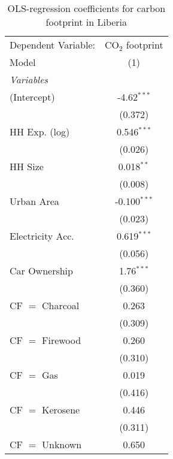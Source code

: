 
\begin{table}[htbp!]
   \centering
   \small
   \begin{adjustbox}{width = 1\textwidth, max height = 0.95\textheight, center}
      \begin{threeparttable}[b]
         \caption{\label{tab:OLS_2_LBR} OLS-regression coefficients for carbon footprint in Liberia}
         \begin{tabular}{lc}
            \tabularnewline \midrule \midrule
            Dependent Variable: & CO$_{2}$ footprint\\  
            Model               & (1)\\  
            \midrule
            \emph{Variables}\\
            (Intercept)         & -4.62$^{***}$\\   
                                & (0.372)\\   
            HH Exp. (log)       & 0.546$^{***}$\\   
                                & (0.026)\\   
            HH Size             & 0.018$^{**}$\\   
                                & (0.008)\\   
            Urban Area          & -0.100$^{***}$\\   
                                & (0.023)\\   
            Electricity Acc.    & 0.619$^{***}$\\   
                                & (0.056)\\   
            Car Ownership       & 1.76$^{***}$\\   
                                & (0.360)\\   
            CF $=$ Charcoal     & 0.263\\   
                                & (0.309)\\   
            CF $=$ Firewood     & 0.260\\   
                                & (0.310)\\   
            CF $=$ Gas          & 0.019\\   
                                & (0.416)\\   
            CF $=$ Kerosene     & 0.446\\   
                                & (0.311)\\   
            CF $=$ Unknown      & 0.650\\   

\end{tabular}
\end{threeparttable}
\end{adjustbox}
\end{table}
